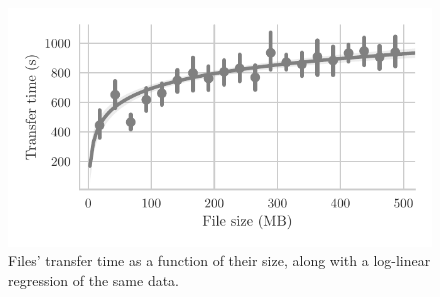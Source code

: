 \begin{figure}[t]
\centering
\includegraphics[width=0.9\columnwidth]{figures/transfer_time_vs_size.pdf}

\caption{\label{fig:transfer_time_vs_size}Files' transfer time as a function of their size, along with a log-linear regression of the same data.}


\end{figure}


